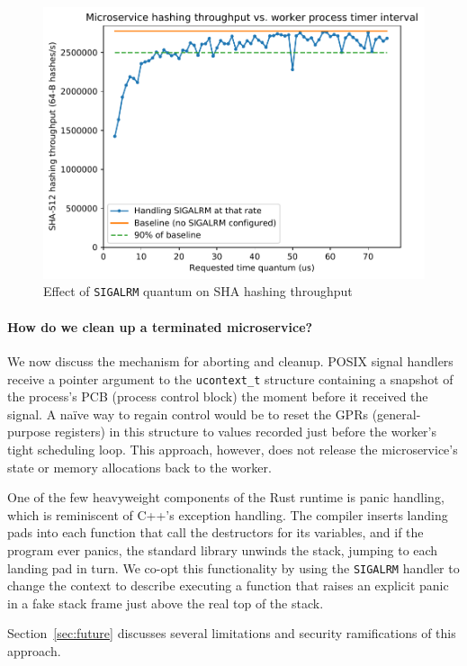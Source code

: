 \begin{figure}
\includegraphics[width=\columnwidth]{figs/2018-02-02-evaluation_quantum-hasher_throughput-throughput}
\caption{Effect of \texttt{SIGALRM} quantum on SHA hashing throughput}
\label{fig:hashtput}
\end{figure}

\paragraph{How do we clean up a terminated microservice?}
We now discuss the mechanism for aborting
and cleanup.  POSIX signal handlers receive a pointer argument to the
\texttt{ucontext\_t} structure containing a snapshot of the process's PCB (process
control block) the moment before it received the signal.  A naïve way to
regain control would be to reset the GPRs (general-purpose registers) in this
structure to values recorded just before the worker's tight scheduling loop.
This approach, however, does not release the microservice's state or memory
allocations back to the worker.

One of the few heavyweight components of the Rust runtime is panic handling, which is
reminiscent of C++'s exception handling.  The compiler inserts landing pads into each
function that call the destructors for its variables, and if the program ever panics,
the standard library unwinds the stack, jumping to each landing pad in turn.  We
co-opt this functionality by using the \texttt{SIGALRM} handler to change the context
to describe executing a function that raises an explicit panic in a fake stack frame
just above the real top of the stack.

Section~\ref{sec:future} discusses several limitations and security
ramifications of this approach.
